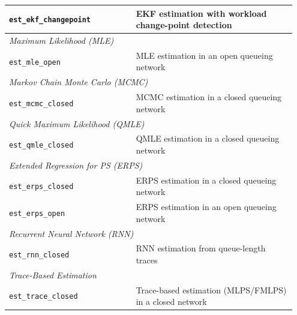 \begin{footnotesize}
\begin{longtable}{|p{0.42\linewidth}|p{0.53\linewidth}|}
\texttt{est\_ekf\_changepoint} & EKF estimation with workload change-point detection\\
\hline
\multicolumn{2}{|l|}{\textit{Maximum Likelihood (MLE)}} \\
\hline
\texttt{est\_mle\_open} & MLE estimation in an open queueing network\\
\hline
\multicolumn{2}{|l|}{\textit{Markov Chain Monte Carlo (MCMC)}} \\
\hline
\texttt{est\_mcmc\_closed} & MCMC estimation in a closed queueing network\\
\hline
\multicolumn{2}{|l|}{\textit{Quick Maximum Likelihood (QMLE)}} \\
\hline
\texttt{est\_qmle\_closed} & QMLE estimation in a closed queueing network\\
\hline
\multicolumn{2}{|l|}{\textit{Extended Regression for PS (ERPS)}} \\
\hline
\texttt{est\_erps\_closed} & ERPS estimation in a closed queueing network\\
\texttt{est\_erps\_open} & ERPS estimation in an open queueing network\\
\hline
\multicolumn{2}{|l|}{\textit{Recurrent Neural Network (RNN)}} \\
\hline
\texttt{est\_rnn\_closed} & RNN estimation from queue-length traces\\
\hline
\multicolumn{2}{|l|}{\textit{Trace-Based Estimation}} \\
\hline
\texttt{est\_trace\_closed} & Trace-based estimation (MLPS/FMLPS) in a closed network\\
\hline
\end{longtable}
\end{footnotesize}
